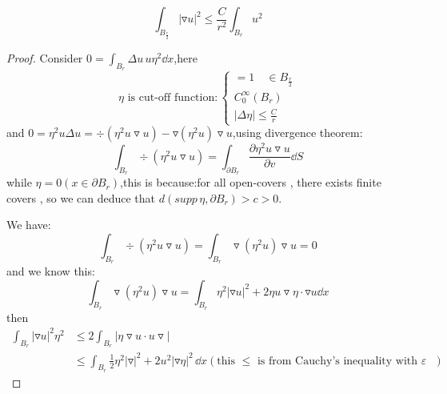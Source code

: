 

\begin{equation*}
    \int_{B_{\frac{r}{2}}}|\triangledown u|^2\leq \frac{C}{r^2}\int_{B_r}u^2
\end{equation*}

\begin{proof}
    Consider $0=\int_{B_r}\Delta u \, u \eta^2\dd x$,here
    \begin{equation*}
        \eta \,\,\text{is cut-off function}:
        \begin{cases}
            =1\quad \in B_{\frac{r}{2}}\\
            C_0^{\infty}(B_r)\\
            |\Delta \eta |\leq \frac{C}{r}
        \end{cases}
    \end{equation*}
    and $0=\eta^2u\Delta u=\div (\eta^2 u\triangledown u)-\triangledown(\eta^2 u)\triangledown u$,using divergence theorem:
    \begin{equation*}
        \int_{B_r}\div (\eta^2u\triangledown u)=\int_{\partial B_r}\frac{\partial \eta^2 u\triangledown u}{\partial v}\dd S
    \end{equation*}
    while $\eta =0 (x\in \partial B_r)$,this is because:for all open-covers , there exists finite covers , so we can deduce that $d(supp\, \eta,\partial B_r)>c>0 $.\par
    We have:
    \begin{equation*}
        \int_{B_r}\div (\eta^2 u\triangledown u)=\int_{B_r} \triangledown (\eta^2u)\triangledown u=0
    \end{equation*}
    and we know this:
    \begin{equation*}
        \int_{B_r} \triangledown (\eta^2u)\triangledown u=\int_{B_r}\eta^2|\triangledown u|^2+2\eta u\triangledown \eta\cdot \triangledown u\dd x
    \end{equation*}
    then
    \begin{equation*}
        \begin{aligned}
            \int_{B_r}|\triangledown u|^2 \eta^2&\leq 2\int_{B_r}|\eta \triangledown u\cdot u\triangledown |\\
            &\leq \int_{B_r}\frac{1}{2}\eta^2|\triangledown|^2+2u^2|\triangledown \eta|^2\,\dd x(\text{this $\leq $ is from Cauchy's inequality with $\varepsilon$ })
        \end{aligned}

\end{equation*}
\end{proof}
